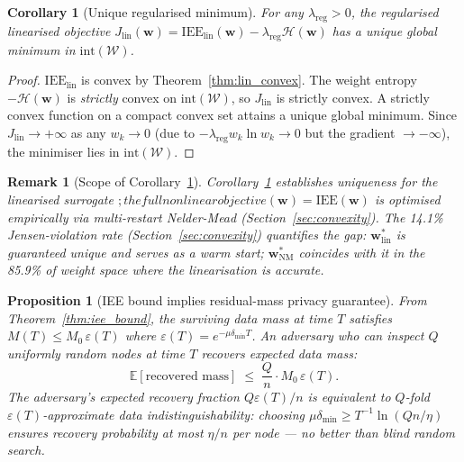 \documentclass[review,12pt]{elsarticle}
\newcommand{\bfw}{\mathbf{w}}
\newcommand{\IEE}{\mathrm{IEE}}
\newtheorem{proposition}{Proposition}
\newtheorem{corollary}{Corollary}
\newtheorem{remark}{Remark}
\begin{document}
\begin{corollary}[Unique regularised minimum]
\label{cor:unique}
For any $\lambda_{\mathrm{reg}} > 0$, the regularised linearised objective
$J_{\mathrm{lin}}(\bfw) = \IEE_{\mathrm{lin}}(\bfw) - \lambda_{\mathrm{reg}}\mathcal{H}(\bfw)$
has a unique global minimum in $\mathrm{int}(\mathcal{W})$.
\end{corollary}

\begin{proof}
$\IEE_{\mathrm{lin}}$ is convex by Theorem~\ref{thm:lin_convex}.
The weight entropy $-\mathcal{H}(\bfw)$ is \emph{strictly} convex on
$\mathrm{int}(\mathcal{W})$, so $J_{\mathrm{lin}}$ is strictly convex.
A strictly convex function on a compact convex set attains a unique
global minimum.  Since $J_{\mathrm{lin}} \to +\infty$ as any
$w_k \to 0$ (due to $-\lambda_{\mathrm{reg}} w_k \ln w_k \to 0$ but
the gradient $\to -\infty$), the minimiser lies in
$\mathrm{int}(\mathcal{W})$.
\end{proof}

\begin{remark}[Scope of Corollary~\ref{cor:unique}]
\label{rem:corollary_scope}
Corollary~\ref{cor:unique} establishes uniqueness for the
\emph{linearised} surrogate {}$; the full nonlinear
objective (\bfw) = \IEE(\bfw)$ is optimised empirically via
multi-restart Nelder-Mead (Section~\ref{sec:convexity}).
The 14.1\% Jensen-violation rate (Section~\ref{sec:convexity})
quantifies the gap: $\bfw^*_{\mathrm{lin}}$ is guaranteed unique and
serves as a warm start; $\bfw^*_{\mathrm{NM}}$ coincides with it in
the 85.9\% of weight space where the linearisation is accurate.
\end{remark}

\begin{proposition}[IEE bound implies residual-mass privacy guarantee]
\label{prop:privacy}
From Theorem~\ref{thm:iee_bound}, the surviving data mass at time $T$
satisfies $M(T) \leq M_0\,\varepsilon(T)$ where
$\varepsilon(T) = e^{-\mu\delta_{\min}T}$.
An adversary who can inspect $Q$ uniformly random nodes at time $T$
recovers expected data mass:
\begin{equation}
  \mathbb{E}[\text{recovered mass}] \;\leq\;
    \frac{Q}{n}\cdot M_0\,\varepsilon(T).
  \label{eq:mass_recovery}
\end{equation}
The adversary's expected \emph{recovery fraction} $Q\varepsilon(T)/n$
is equivalent to $Q$-fold $\varepsilon(T)$-approximate data indistinguishability:
choosing $\mu\delta_{\min} \geq T^{-1}\ln(Qn/\eta)$ ensures recovery
probability at most $\eta/n$ per node --- no better than blind random search.
\end{proposition}
\end{document}
